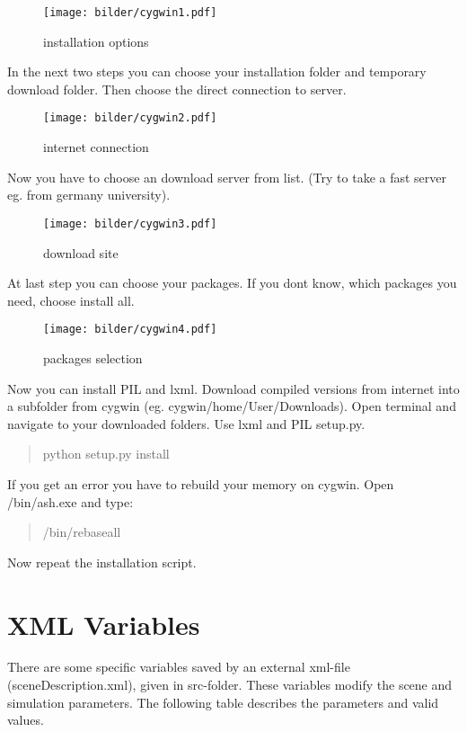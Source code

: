 \documentclass[10pt,a4paper]{report}
\begin{document}
\begin{figure}[H]
\centering
\texttt{[image: bilder/cygwin1.pdf]} 
\caption{installation options}
\end{figure}

In the next two steps you can choose your installation folder and temporary download folder. Then choose the direct connection to server.

\begin{figure}[H]
\centering
\texttt{[image: bilder/cygwin2.pdf]} 
\caption{internet connection}
\end{figure}

Now you have to choose an download server from list. (Try to take a fast server eg. from germany university).

\begin{figure}[H]
\centering
\texttt{[image: bilder/cygwin3.pdf]} 
\caption{download site}
\end{figure}

At last step you can choose your packages. If you dont know, which packages you need, choose install all.

\begin{figure}[H]
\centering
\texttt{[image: bilder/cygwin4.pdf]} 
\caption{packages selection}
\end{figure}

Now you can install PIL and lxml. Download compiled versions from internet into a subfolder from cygwin (eg. cygwin/home/User/Downloads). Open terminal and navigate to your downloaded folders. Use lxml and PIL setup.py.

\begin{quote}
python setup.py install
\end{quote}

If you get an error you have to rebuild your memory on cygwin. Open /bin/ash.exe and type:

\begin{quote}
/bin/rebaseall
\end{quote}

Now repeat the installation script.

\chapter{XML Variables}
\label{chap:xml_variables}

There are some specific variables saved by an external xml-file (sceneDescription.xml), given in src-folder. These variables modify the scene and simulation parameters. The following table describes the parameters and valid values.
\end{document}
